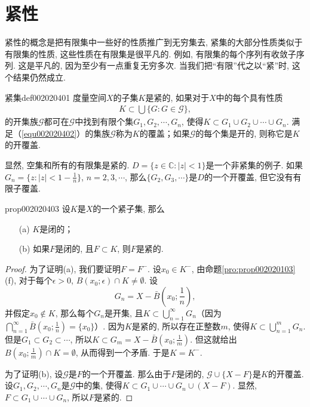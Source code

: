 \section{紧性}\label{section0020204}
紧性的概念是把有限集中一些好的性质推广到无穷集去, 紧集的大部分性质类似于有限集的性质, 这些性质在有限集是很平凡的. 例如, 有限集的每个序列有收敛子序列. 这是平凡的, 因为至少有一点重复无穷多次. 当我们把“有限”代之以“紧”时, 这个结果仍然成立. 

\begin{definition}{紧集}{def002020401}
度量空间$X$的子集$K$是紧的, 如果对于$X$中的每个具有性质
\begin{gather}\label{equ002020402}
K \subset \bigcup\{G: G \in \mathscr{G}\},
\end{gather}
的开集族$\mathscr{G}$都可在$\mathscr{G}$中找到有限个集$G_1, G_2, \cdots, G_n$, 使得$K \subset G_1 \cup G_2 \cup \cdots \cup G_n$. 满足（\ref{equ002020402}）的集族$\mathscr{G}$称为$K$的覆盖；如果$\mathscr{G}$的每个集是开的, 则称它是$K$的开覆盖. 
\end{definition}

显然, 空集和所有的有限集是紧的. $D = \{z \in \mathbb{C}:|z|<1\}$是一个非紧集的例子. 如果$G_n = \big\{z : |z| < 1 - \frac{1}{n}\big\}$, $n=2,3,\cdots$, 那么$\{G_2, G_3, \cdots\}$是$D$的一个开覆盖, 但它没有有限子覆盖. 

\begin{proposition}{}{prop002020403}
设$K$是$X$的一个紧子集, 那么
\begin{enumerate}
\item[(a)]$K$是闭的；
\item[(b)]如果$F$是闭的, 且$F \subset K$, 则$F$是紧的. 
\end{enumerate}
\end{proposition}

\begin{proof}
为了证明(a), 我们要证明$F = F^-$. 设$x_0 \in K^-$, 由命题\ref{pro:prop002020103}(f), 对于每个$\epsilon > 0$, $B(x_0;\epsilon) \cap K \neq \emptyset$. 设
\[
G_n = X - \bar{B}(x_0; \frac{1}{n}),
\]
并假定$x_0 \not\in K$, 那么每个$G_n$是开集, 且$K \subset \bigcup_{n=1}^{\infty}{G_n}$（因为$\bigcap_{n=1}^{\infty}{\bar{B}(x_0; \frac{1}{n})} = \{x_0\}$）. 因为$K$是紧的, 所以存在正整数$m$, 使得$K \subset \bigcup_{n=1}^{m}{G_n}$. 但是$G_1 \subset G_2 \subset \cdots$, 所以$K \subset G_m = X - \bar{B}(x_0;\frac{1}{m})$. 但这就给出$B(x_0; \frac{1}{m}) \cap K = \emptyset$, 从而得到一个矛盾. 于是$K = K^-$. 

为了证明(b), 设$\mathscr{G}$是$F$的一个开覆盖. 那么由于$F$是闭的, $\mathscr{G} \cup \{X-F\}$是$K$的开覆盖. 设$G_1, G_2, \cdots, G_n$是$\mathscr{G}$中的集, 使得$K \subset G_1 \cup \cdots \cup G_n \cup (X-F)$. 显然, $F \subset G_1 \cup \cdots \cup G_n$, 所以$F$是紧的. 
\end{proof}

